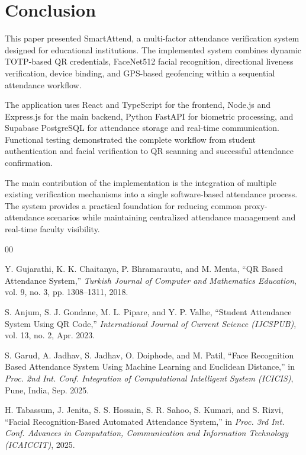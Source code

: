 \documentclass[conference]{IEEEtran}
\begin{document}
\section{Conclusion}

This paper presented SmartAttend, a multi-factor attendance verification system designed for educational institutions. The implemented system combines dynamic TOTP-based QR credentials, FaceNet512 facial recognition, directional liveness verification, device binding, and GPS-based geofencing within a sequential attendance workflow.

The application uses React and TypeScript for the frontend, Node.js and Express.js for the main backend, Python FastAPI for biometric processing, and Supabase PostgreSQL for attendance storage and real-time communication. Functional testing demonstrated the complete workflow from student authentication and facial verification to QR scanning and successful attendance confirmation.

The main contribution of the implementation is the integration of multiple existing verification mechanisms into a single software-based attendance process. The system provides a practical foundation for reducing common proxy-attendance scenarios while maintaining centralized attendance management and real-time faculty visibility.


\begin{thebibliography}{00}

Y. Gujarathi, K. K. Chaitanya, P. Bhramarautu, and M. Menta,
``QR Based Attendance System,''
\textit{Turkish Journal of Computer and Mathematics Education},
vol. 9, no. 3, pp. 1308--1311, 2018.

S. Anjum, S. J. Gondane, M. L. Pipare, and Y. P. Valhe,
``Student Attendance System Using QR Code,''
\textit{International Journal of Current Science (IJCSPUB)},
vol. 13, no. 2, Apr. 2023.

S. Garud, A. Jadhav, S. Jadhav, O. Doiphode, and M. Patil,
``Face Recognition Based Attendance System Using Machine Learning and Euclidean Distance,''
in \textit{Proc. 2nd Int. Conf. Integration of Computational Intelligent System (ICICIS)},
Pune, India, Sep. 2025.

H. Tabassum, J. Jenita, S. S. Hossain, S. R. Sahoo,
S. Kumari, and S. Rizvi,
``Facial Recognition-Based Automated Attendance System,''
in \textit{Proc. 3rd Int. Conf. Advances in Computation, Communication and Information Technology (ICAICCIT)},
2025.

\end{thebibliography}
\end{document}
